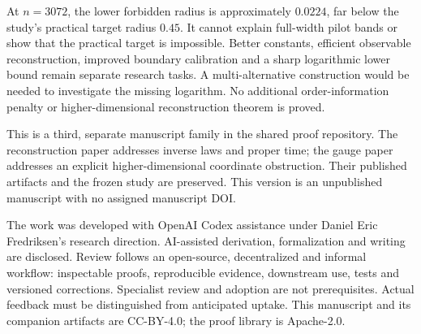 \documentclass[11pt]{article}
\theoremstyle{remark}
\begin{document}
At $n=3072$, the lower forbidden radius is approximately $0.0224$,
far below the study's practical target radius $0.45$.
It cannot explain full-width pilot bands or show that the practical
target is impossible. Better constants, efficient observable
reconstruction, improved boundary calibration and a sharp logarithmic
lower bound remain separate research tasks. A multi-alternative
construction would be needed to investigate the missing logarithm.
No additional order-information penalty or higher-dimensional
reconstruction theorem is proved.

This is a third, separate manuscript family in the shared proof
repository. The reconstruction paper \cite{Reconstruction} addresses
inverse laws and proper time; the gauge paper \cite{Gauge} addresses
an explicit higher-dimensional coordinate obstruction. Their published
artifacts and the frozen study are preserved. This version is an
unpublished manuscript with no assigned manuscript DOI.

The work was developed with OpenAI Codex assistance under Daniel Eric
Fredriksen's research direction. AI-assisted derivation, formalization
and writing are disclosed. Review follows an open-source,
decentralized and informal workflow: inspectable proofs, reproducible
evidence, downstream use, tests and versioned corrections. Specialist
review and adoption are not prerequisites. Actual feedback must be
distinguished from anticipated uptake. This manuscript and its
companion artifacts are CC-BY-4.0; the proof library is Apache-2.0.
\end{document}
